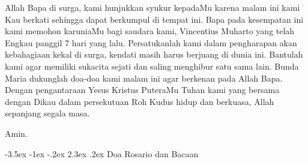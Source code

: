 \documentclass[a5paper,titlepage,12pt]{scrbook}
\makeatletter
\renewcommand{\section}{\@startsection {section}{1}{\z@}%
                                   {-3.5ex \@plus -1ex \@minus -.2ex}%
                                   {2.3ex \@plus.2ex}%
                                   {\normalfont\normalsize\bfseries}}
\newcommand{\arwah}{Vincentius Muharto }
\makeatother
\begin{document}
Allah Bapa di surga, kami hunjukkan syukur kepadaMu karena malam ini kami Kau berkati sehingga dapat berkumpul di tempat ini. Bapa pada kesempatan ini kami memohon karuniaMu bagi saudara kami, \arwah yang telah Engkau panggil 7 hari yang lalu.  Persatukanlah kami dalam pengharapan akan kebahagiaan kekal di surga, kendati masih harus berjuang di dunia ini. Bantulah kami agar memiliki sukacita sejati dan saling menghibur satu sama lain. Bunda Maria dukunglah doa-doa kami malam ini agar berkenan pada Allah Bapa. Dengan pengantaraan Yesus Kristus PuteraMu Tuhan kami yang bersama dengan Dikau dalam persekutuan Roh Kudus hidup dan berkuasa, Allah sepanjang segala masa.

Amin.

\section{Doa Rosario dan Bacaan}
\end{document}

